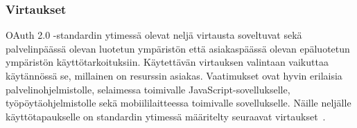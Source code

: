 \documentclass[finnish,gradu]{tktltiki}
\begin{document}


  \subsubsection{Virtaukset} %
  \label{ssub:oauth_virtaukset}

  OAuth 2.0 -standardin ytimessä olevat neljä virtausta soveltuvat sekä palvelinpäässä olevan luotetun ympäristön että asiakaspäässä olevan epäluotetun ympäristön käyttötarkoituksiin. Käytettävän virtauksen valintaan vaikuttaa käytännössä se, millainen on resurssin asiakas. Vaatimukset ovat hyvin erilaisia palvelinohjelmistolle, selaimessa toimivalle JavaScript-sovellukselle, työpöytäohjelmistolle sekä mobiililaitteessa toimivalle sovellukselle. Näille neljälle käyttötapaukselle on standardin ytimessä määritelty seuraavat virtaukset~\cite{ietf_oauth2}.

\end{document}
